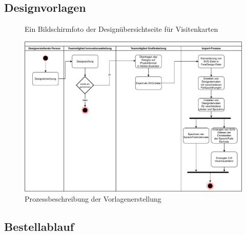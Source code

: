 \subsection{Designvorlagen}

\begin{figure}[H]
    \centering
    \caption{Ein Bildschirmfoto der Designübersichtseite für Visitenkarten}
    \label{fig:Designuebersichtseite}
\end{figure}

\begin{figure}[H]
    \centering
    \includegraphics[width=.98\textwidth]{diagrams/Freedesign-Vorlagenerstellung.pdf}
\caption{Prozessbeschreibung der Vorlagenerstellung}
\label{fig:Vorlagenimport}
\end{figure}

\subsection{Bestellablauf}

